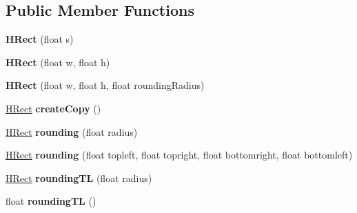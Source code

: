 \subsection*{Public Member Functions}
\begin{DoxyCompactItemize}
\item 
\hypertarget{classhype_1_1drawable_1_1_h_rect_a919b2296fa3e20e697beab3793991b61}{{\bfseries H\-Rect} (float s)}\label{classhype_1_1drawable_1_1_h_rect_a919b2296fa3e20e697beab3793991b61}

\item 
\hypertarget{classhype_1_1drawable_1_1_h_rect_a2d8a05687abe254f2f3acc00c07a315c}{{\bfseries H\-Rect} (float w, float h)}\label{classhype_1_1drawable_1_1_h_rect_a2d8a05687abe254f2f3acc00c07a315c}

\item 
\hypertarget{classhype_1_1drawable_1_1_h_rect_ad54b4ba53618a7cca904ab7655344b12}{{\bfseries H\-Rect} (float w, float h, float rounding\-Radius)}\label{classhype_1_1drawable_1_1_h_rect_ad54b4ba53618a7cca904ab7655344b12}

\item 
\hypertarget{classhype_1_1drawable_1_1_h_rect_a0a7755f887098c94cff922e8230cad65}{\hyperlink{classhype_1_1drawable_1_1_h_rect}{H\-Rect} {\bfseries create\-Copy} ()}\label{classhype_1_1drawable_1_1_h_rect_a0a7755f887098c94cff922e8230cad65}

\item 
\hypertarget{classhype_1_1drawable_1_1_h_rect_a603f506e1589c28db3f0a95d20cdd939}{\hyperlink{classhype_1_1drawable_1_1_h_rect}{H\-Rect} {\bfseries rounding} (float radius)}\label{classhype_1_1drawable_1_1_h_rect_a603f506e1589c28db3f0a95d20cdd939}

\item 
\hypertarget{classhype_1_1drawable_1_1_h_rect_a8f58251d67b64ad7b6303281cfbb0b0f}{\hyperlink{classhype_1_1drawable_1_1_h_rect}{H\-Rect} {\bfseries rounding} (float topleft, float topright, float bottomright, float bottomleft)}\label{classhype_1_1drawable_1_1_h_rect_a8f58251d67b64ad7b6303281cfbb0b0f}

\item 
\hypertarget{classhype_1_1drawable_1_1_h_rect_a161506ef0aa92d72dfac64a03f754c78}{\hyperlink{classhype_1_1drawable_1_1_h_rect}{H\-Rect} {\bfseries rounding\-T\-L} (float radius)}\label{classhype_1_1drawable_1_1_h_rect_a161506ef0aa92d72dfac64a03f754c78}

\item 
\hypertarget{classhype_1_1drawable_1_1_h_rect_a765e79a1a12db4eadee8d04c2f6dc779}{float {\bfseries rounding\-T\-L} ()}\label{classhype_1_1drawable_1_1_h_rect_a765e79a1a12db4eadee8d04c2f6dc779}


\end{DoxyCompactItemize}
